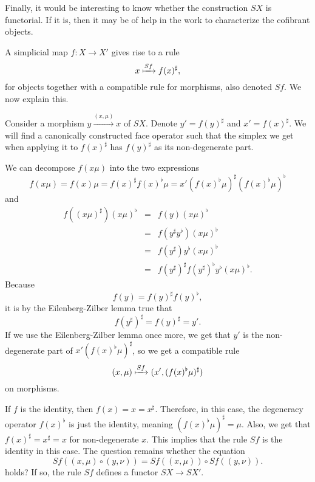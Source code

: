 Finally, it would be interesting to know whether the construction $SX$ is functorial. If it is, then it may be of help in the work to characterize the cofibrant objects.
\begin{remark}\label{rem:question_is_SX_functorial}
A simplicial map $f:X\to X'$ gives rise to a rule
\[x\xmapsto{Sf} f(x)^\sharp,\]
for objects together with a compatible rule for morphisms, also denoted $Sf$. We now explain this.

Consider a morphism $y\xrightarrow{(x,\mu )} x$ of $SX$. Denote $y'=f(y)^\sharp$ and $x'=f(x)^\sharp$. We will find a canonically constructed face operator such that the simplex we get when applying it to $f(x)^\sharp$ has $f(y)^\sharp$ as its non-degenerate part.

We can decompose $f(x\mu )$ into the two expressions
\[f(x\mu )=f(x)\mu =f(x)^\sharp f(x)^\flat \mu =x'(f(x)^\flat \mu )^\sharp (f(x)^\flat \mu )^\flat\]
and
\begin{displaymath}
\begin{array}{rcl}
f((x\mu )^\sharp )(x\mu )^\flat & = & f(y)(x\mu )^\flat \\
& = & f(y^\sharp y^\flat )(x\mu )^\flat \\
& = & f(y^\sharp )y^\flat (x\mu )^\flat \\
& = & f(y^\sharp )^\sharp f(y^\sharp )^\flat y^\flat (x\mu )^\flat .
\end{array}
\end{displaymath}
Because
\[f(y)=f(y)^\sharp f(y)^\flat ,\]
it is by the Eilenberg-Zilber lemma true that
\[f(y^\sharp )^\sharp =f(y)^\sharp =y'.\]
If we use the Eilenberg-Zilber lemma once more, we get that $y'$ is the non-degenerate part of $x'(f(x)^\flat \mu )^\sharp$, so we get a compatible rule
\[(x,\mu )\xmapsto{Sf} (x',(f(x)^\flat \mu )^\sharp )\]
on morphisms.

If $f$ is the identity, then $f(x)=x=x^\sharp$. Therefore, in this case, the degeneracy operator $f(x)^\flat$ is just the identity, meaning $(f(x)^\flat \mu )^\sharp =\mu$. Also, we get that $f(x)^\sharp =x^\sharp =x$ for non-degenerate $x$. This implies that the rule $Sf$ is the identity in this case. The question remains whether the equation
\begin{equation}\label{eq:question_is_SX_functorial}
Sf((x,\mu )\circ (y,\nu ))=Sf((x,\mu ))\circ Sf((y,\nu )).
\end{equation}
holds? If so, the rule $Sf$ defines a functor $SX\to SX'$.
\end{remark}



